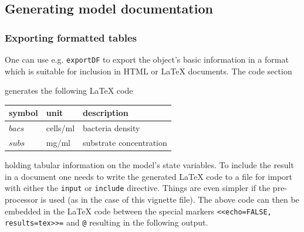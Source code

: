 \documentclass[onecolumn]{article}
\begin{document}

\subsection{Generating model documentation} \label{sec:advanced:doc}

\subsubsection{Exporting formatted tables} \label{sec:advanced:doc:tables}

One can use e.g. \verb|exportDF| to export the object's basic information in a format which is suitable for inclusion in HTML or \LaTeX{} documents. The code section

\begin{Schunk}
\end{Schunk}

generates the following \LaTeX{} code

\begin{shaded}
\begin{Schunk}
\begin{Soutput}
  \begin{tabular}{lll}\hline
    \textbf{symbol} & \textbf{unit} & \textbf{description} \\ \hline
    $bacs$ & cells/ml & bacteria density \\
    $subs$ & mg/ml & substrate concentration \\ \hline
  \end{tabular}
\end{Soutput}
\end{Schunk}
\end{shaded}

holding tabular information on the model's state variables. To include the result in a document one needs to write the generated \LaTeX{} code to a file for import with either the \verb|input| or \verb|include| directive. Things are even simpler if the  pre-processor is used (as in the case of this vignette file). The above  code can then be embedded in the \LaTeX{} code between the special markers \verb|<<echo=FALSE, results=tex>>=| and \verb|@| resulting in the following output.
\end{document}
